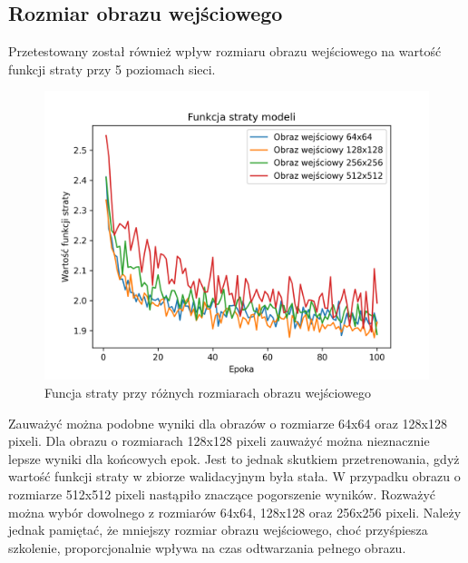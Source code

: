 \documentclass[a4paper,11pt]{article}
\begin{document}
\subsection{Rozmiar obrazu wejściowego}
Przetestowany został również wpływ rozmiaru obrazu wejściowego na wartość funkcji straty przy 5 poziomach sieci.
\begin{figure}[h!]
\begin{center}
	\includegraphics[width=0.7\columnwidth]{size.png}
	\caption{Funcja straty przy różnych rozmiarach obrazu wejściowego}
\end{center}
\end{figure}
Zauważyć można podobne wyniki dla obrazów o rozmiarze 64x64 oraz 128x128 pixeli.
Dla obrazu o rozmiarach 128x128 pixeli zauważyć można nieznacznie lepsze wyniki dla końcowych epok.
Jest to jednak skutkiem przetrenowania, gdyż wartość funkcji straty w zbiorze walidacyjnym była stała.
W przypadku obrazu o rozmiarze 512x512 pixeli nastąpiło znaczące pogorszenie wyników.
Rozważyć można wybór dowolnego z rozmiarów 64x64, 128x128 oraz 256x256 pixeli.
Należy jednak pamiętać, że mniejszy rozmiar obrazu wejściowego, choć przyśpiesza szkolenie,
proporcjonalnie wpływa na czas odtwarzania pełnego obrazu.
\end{document}
